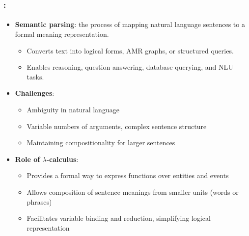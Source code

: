 \documentclass[xcolor=table]{beamer}
\begin{document}
\begin{frame}
	\frametitle{\insertshortsubtitle: \insertsection}
	\framesubtitle{\insertsubsection}
	
	\begin{itemize}
		\item \textbf{Semantic parsing}: the process of mapping natural language sentences to a formal meaning representation.
		\begin{itemize}
			\item Converts text into logical forms, AMR graphs, or structured queries.
			\item Enables reasoning, question answering, database querying, and NLU tasks.
		\end{itemize}
		
		\item \textbf{Challenges}:
		\begin{itemize}
			\item Ambiguity in natural language
			\item Variable numbers of arguments, complex sentence structure
			\item Maintaining compositionality for larger sentences
		\end{itemize}
		
		\item \textbf{Role of $\lambda$-calculus}:
		\begin{itemize}
			\item Provides a formal way to express functions over entities and events
			\item Allows composition of sentence meanings from smaller units (words or phrases)
			\item Facilitates variable binding and reduction, simplifying logical representation
		\end{itemize}
	\end{itemize}
	
	
\end{frame}
\end{document}
